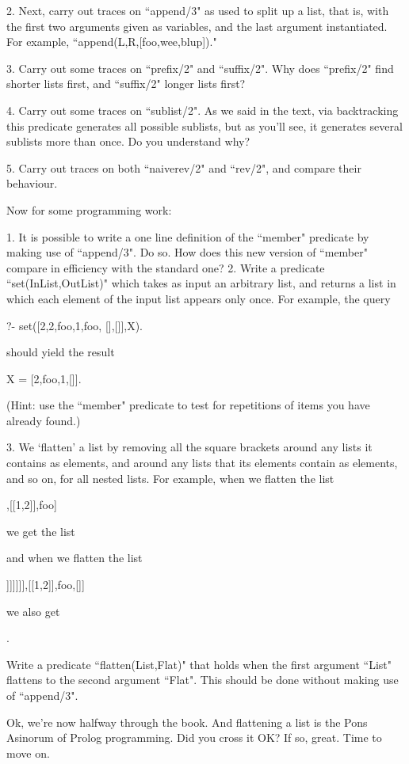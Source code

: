 2. Next, carry out traces on ``append/3" as used to split up a
list, that is, with the first two arguments given as variables, and the
last argument instantiated. For example,
``append(L,R,[foo,wee,blup])."

3. Carry out some traces on ``prefix/2" and ``suffix/2". Why
does ``prefix/2" find shorter lists first, and
``suffix/2" longer lists first?

4. Carry out some traces on ``sublist/2". As we said in the text,
via backtracking this predicate generates all possible sublists, but
as you'll see, it generates several sublists more than once. Do you
understand why?

5. Carry out traces on both ``naiverev/2" and ``rev/2", and
compare their behaviour.


Now for some programming work:


1. It is possible to write a one line definition of the
``member" predicate by making use of ``append/3". Do so. How
does this new version of ``member" compare in efficiency with the
standard one?
2. Write a predicate ``set(InList,OutList)" which takes as
input an arbitrary list, and returns a list in which each element of
the input list appears only once. For example, the query
\begin{LPNcodedisplay}
?- set([2,2,foo,1,foo, [],[]],X).
\end{LPNcodedisplay}

should yield the result
\begin{LPNcodedisplay}
X = [2,foo,1,[]].
\end{LPNcodedisplay}

(Hint: use  the ``member" predicate to test for repetitions
of items you have already found.)

3. We `flatten' a list by removing all the square brackets around
any lists it contains as elements, and around any lists that its
elements contain as elements, and so on, for all nested lists. For
example, when we flatten the list
\begin{LPNcodedisplay}
[a,b,[c,d],[[1,2]],foo]
\end{LPNcodedisplay}

we get the list
\begin{LPNcodedisplay}
[a,b,c,d,1,2,foo]
\end{LPNcodedisplay}

and when we flatten the list
\begin{LPNcodedisplay}
[a,b,[[[[[[[c,d]]]]]]],[[1,2]],foo,[]]
\end{LPNcodedisplay}
we also get
\begin{LPNcodedisplay}
[a,b,c,d,1,2,foo].
\end{LPNcodedisplay}
Write a predicate ``flatten(List,Flat)" that holds when the first
argument ``List" flattens to the second argument ``Flat".
This should be done without making use of ``append/3".


\medskip

Ok, we're now halfway through the book. And flattening a list is the
Pons Asinorum of Prolog programming. Did you cross it OK?  If so,
great. Time to move on.

